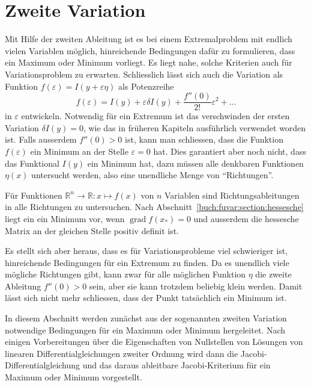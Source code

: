 %
%
%
\chapter{Zweite Variation
\label{buch:chapter:variation2}}
Mit Hilfe der zweiten Ableitung ist es bei einem Extremalproblem
mit endlich vielen Variablen möglich, hinreichende Bedingungen dafür
zu formulieren, dass ein Maximum oder Minimum vorliegt.
Es liegt nahe, solche Kriterien auch für Variationsproblem
zu erwarten.
Schliesslich lässt sich auch die Variation als Funktion
$f(\varepsilon) = I(y+\varepsilon\eta)$ als Potenzreihe
\[
f(\varepsilon)
=
I(y) + \varepsilon \delta I(y) + \frac{f''(0)}{2!}\varepsilon^2 + \dots
\]
in $\varepsilon$ entwickeln.
Notwendig für ein Extremum ist das verschwinden der ersten Variation
$\delta I(y)=0$, wie das in früheren Kapiteln ausführlich verwendet
worden ist.
Falls ausserdem $f''(0)>0$ ist, kann man schliessen, dass die
Funktion $f(\varepsilon)$ ein Minimum an der Stelle $\varepsilon=0$
hat.
Dies garantiert aber noch nicht, dass das Funktional $I(y)$
ein Minimum hat, dazu müssen alle denkbaren Funktionen $\eta(x)$
untersucht werden, also eine unendliche Menge von ``Richtungen''.

Für Funktionen $\mathbb{R}^n\to\mathbb{R}: x\mapsto f(x)$ von
$n$ Variablen sind Richtungsableitungen in alle Richtungen zu
untersuchen.
Nach Abschnitt~\ref{buch:fuvar:section:hessesche} liegt ein
ein Minimum vor, wenn $\operatorname{grad}f(x_*)=0$ und ausserdem
die hessesche Matrix an der gleichen Stelle positiv definit ist.

Es stellt sich aber heraus, dass es für Variationsprobleme viel
schwieriger ist, hinreichende Bedingungen für ein Extremum zu finden.
Da es unendlich viele mögliche Richtungen gibt, kann zwar für alle
möglichen Funktion $\eta$ die zweite Ableitung $f''(0)>0$ sein, aber 
sie kann trotzdem beliebig klein werden.
Damit lässt sich nicht mehr schliessen, dass der Punkt tatsächlich
ein Minimum ist.

In diesem Abschnitt werden zunächst aus der sogenannten zweiten
Variation notwendige Bedingungen für ein Maximum oder Minimum
hergeleitet.
Nach einigen Vorbereitungen über die Eigenschaften von Nullstellen
von Lösungen von linearen Differentialgleichungen zweiter Ordnung
wird dann die Jacobi-Differentialgleichung und das daraus ableitbare
Jacobi-Kriterium für ein Maximum oder Minimum vorgestellt.






